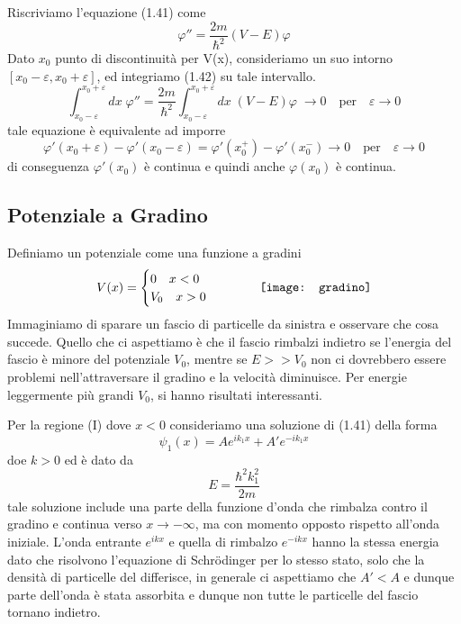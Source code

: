 \noindent Riscriviamo l'equazione (1.41) come 
\begin{equation}
	\varphi'' = \frac{2m}{\hbar^2}(V-E)\varphi
\end{equation}
Dato $x_0$ punto di discontinuit\`a per V(x), consideriamo un suo intorno $[x_0 - \varepsilon , x_0 + \varepsilon]$, ed integriamo (1.42) su tale intervallo.
\begin{equation*}
	\int_{x_0 - \varepsilon}^{x_0 + \varepsilon}dx \; \varphi'' = \frac{2m}{\hbar^2} \int_{x_0 - \varepsilon}^{x_0 + \varepsilon} dx \; (V-E)\varphi \; \to 0 \quad \text{per} \quad \varepsilon \to 0
\end{equation*}
tale equazione \`e equivalente ad imporre 
\begin{equation*}
	\varphi'(x_0+ \varepsilon) - \varphi'(x_0 - \varepsilon)  = \varphi'(x_0^+) - \varphi'(x_0^-) \to 0 \quad \text{per} \quad \varepsilon \to 0
\end{equation*}
di conseguenza $\varphi'(x_0)$ \`e continua e quindi anche $\varphi(x_0)$ \`e continua.
 
 \newpage
 
 \subsection{Potenziale a Gradino}
 
 Definiamo un potenziale  come una funzione a gradini
 \begin{equation*}
 	V(x) = \begin{cases}
 		0 \quad x < 0 \\
 		V_0 \quad x> 0 \\
 	\end{cases}	
 	\quad\quad\quad 
 	\vcenter{\hbox{\texttt{[image: gradino]}}}
 \end{equation*}
 Immaginiamo di sparare un fascio di particelle da sinistra e osservare che cosa succede. Quello che ci aspettiamo \`e che il fascio rimbalzi indietro se l'energia del fascio \`e minore del potenziale $V_0$, mentre se $E >> V_0$ non ci dovrebbero essere problemi nell'attraversare il gradino e la velocit\`a diminuisce. Per energie leggermente pi\`u grandi $V_0$, si hanno risultati interessanti.
\newline

\noindent  Per la regione (I) dove $x< 0$ consideriamo una soluzione di (1.41) della forma 
\begin{equation*}
	\psi_{1}(x) = Ae^{ik_1x}+A'e^{-ik_1x}
\end{equation*}
doe $k >0$ ed \`e dato da 
\begin{equation*}
	E = \frac{\hbar^2k_1^2}{2m}
\end{equation*}
tale soluzione include una parte della funzione d'onda che rimbalza contro il gradino e continua verso $x \to - \infty$, ma con momento opposto rispetto all'onda iniziale. L'onda entrante $e^{ikx}$ e quella di rimbalzo $e^{-ikx}$ hanno la stessa energia dato che risolvono l'equazione di Schr\"odinger per lo stesso stato, solo che la densit\`a di particelle del differisce, in generale ci aspettiamo che $A' < A$ e dunque parte dell'onda \`e stata assorbita e dunque non tutte le particelle del fascio tornano indietro.
\newline

